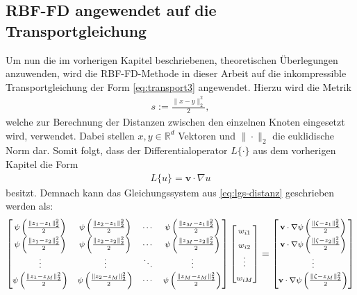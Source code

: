 \documentclass[12pt,titlepage]{article}
\begin{document}
\subsection{RBF-FD angewendet auf die Transportgleichung}
Um nun die im vorherigen Kapitel beschriebenen, theoretischen Überlegungen anzuwenden, wird die RBF-FD-Methode in dieser Arbeit auf die inkompressible Transportgleichung der Form \eqref{eq:transport3} angewendet. Hierzu wird die Metrik
\begin{align}
 s:=\frac{\|x-y\|_2^2}{2},\nonumber
\end{align}
welche zur Berechnung der Distanzen zwischen den einzelnen Knoten eingesetzt wird, verwendet. Dabei stellen $x,y\in\mathbb{R}^d$  Vektoren und $\|\cdot\|_2$ die euklidische Norm dar. Somit folgt, dass der Differentialoperator $L\{\cdot\}$ aus dem vorherigen Kapitel die Form
\begin{align}
 L\{u\}=\textbf{v}\cdot\nabla u\nonumber
\end{align}
besitzt. Demnach kann das Gleichungssystem aus \eqref{eq:lgs-distanz} geschrieben werden als:
\begin{align*}
\renewcommand\arraystretch{1.57}
{\footnotesize
\begin{bmatrix}
  \psi\left(\frac{\|z_1-z_1\|_2^2}{2}\right) & \psi\left(\frac{\|z_2-z_1\|_2^2}{2}\right) & \cdots & \psi\left(\frac{\|z_M-z_1\|_2^2}{2}\right) \\
 \psi\left(\frac{\|z_1-z_2\|_2^2}{2}\right) & \psi\left(\frac{\|z_2-z_2\|_2^2}{2}\right) & \cdots & \psi\left(\frac{\|z_M-z_2\|_2^2}{2}\right) \\
 \vdots & \vdots & \ddots & \vdots \\
 \psi\left(\frac{\|z_1-z_M\|_2^2}{2}\right) & \psi\left(\frac{\|z_2-z_M\|_2^2}{2}\right) & \cdots & \psi\left(\frac{\|z_M-z_M\|_2^2}{2}\right)
\end{bmatrix}
\begin{bmatrix}
 w_{i1} \\
 w_{i2} \\
 \vdots \\
 w_{iM}
\end{bmatrix}
=
\begin{bmatrix}
 \textbf{v}\cdot\nabla\psi\left(\frac{\|\zeta-z_1\|_2^2}{2}\right) \\
 \textbf{v}\cdot\nabla\psi\left(\frac{\|\zeta-z_2\|_2^2}{2}\right) \\
 \vdots \\
 \textbf{v}\cdot\nabla\psi\left(\frac{\|\zeta-z_M\|_2^2}{2}\right)
\end{bmatrix}
}
\end{align*}
\end{document}
